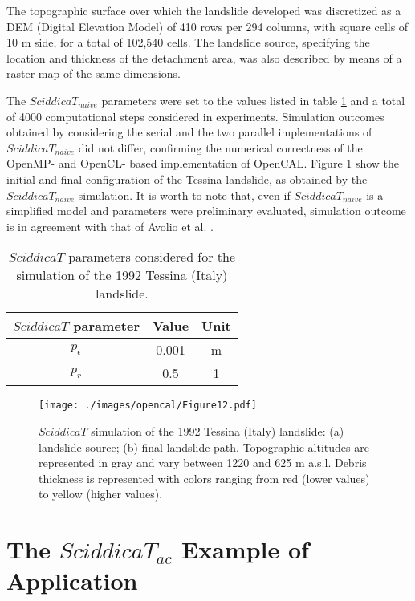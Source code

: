 The topographic surface over which the landslide developed was
discretized as a DEM (Digital Elevation Model) of 410 rows per 294
columns, with square cells of 10 m side, for a total of 102,540
cells. The landslide source, specifying the location and thickness
of the detachment area, was also described by means of a raster map
of the same dimensions.

The $SciddicaT_{naive}$ parameters were set to the values listed in
table \ref{tab:sciddicaT-params} and a total of 4000 computational
steps considered in experiments. Simulation outcomes obtained by
considering the serial and the two parallel implementations of
$SciddicaT_{naive}$ did not differ, confirming the numerical
correctness of the OpenMP- and OpenCL- based implementation of
OpenCAL. Figure \ref{fig:sciddicaT-simulation} show the initial and
final configuration of the Tessina landslide, as obtained by the
$SciddicaT_{naive}$ simulation. It is worth to note that, even if
$SciddicaT_{naive}$ is a simplified model and parameters were
preliminary evaluated, simulation outcome is in agreement with that
of Avolio et al. \cite{avolio2000simulation}.
\begin{table}
	\centering
	\begin{tabular}{ccc}
		\hline $SciddicaT$ parameter & Value & Unit \\ \hline
		$p_\epsilon$ & 0.001 & \si{m}\\ $p_r$ & 0.5 & 1\\ \hline
	\end{tabular}
	\caption{$SciddicaT$ parameters considered for the simulation of the 1992
		Tessina (Italy) landslide.}
	\label{tab:sciddicaT-params}
\end{table}

\begin{figure}
	\begin{center}
		\texttt{[image: ./images/opencal/Figure12.pdf]}
		\caption[$SciddicaT$ simulation of the 1992 Tessina (Italy) landslide.]{$SciddicaT$ simulation of the 1992 Tessina (Italy) landslide: (a) landslide source; (b) final landslide path. Topographic altitudes are represented in gray and vary between 1220 and 625 m a.s.l. Debris
		thickness is represented with colors ranging from red (lower values)
		to yellow (higher values).}
		\label{fig:sciddicaT-simulation}
	\end{center}
\end{figure}

\section{The $SciddicaT_{ac}$ Example of Application}
\label{sec:SciddicaT-ac}

